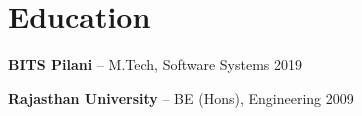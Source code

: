 \section{Education}
\textbf{BITS Pilani} – M.Tech, Software Systems \hfill 2019\par
\textbf{Rajasthan University} – BE (Hons), Engineering \hfill 2009
